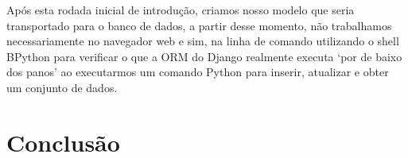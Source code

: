 \documentclass[a4paper]{report}
\begin{document}
        Após esta rodada inicial de introdução, criamos nosso modelo que seria
        transportado para o banco de dados, a partir desse momento, não
        trabalhamos necessariamente no navegador web e sim, na linha de comando
        utilizando o shell BPython para verificar o que a ORM do Django
        realmente executa `por de baixo dos panos' ao executarmos um comando
        Python para inserir, atualizar e obter um conjunto de dados.

        \section{Conclusão}
\end{document}
